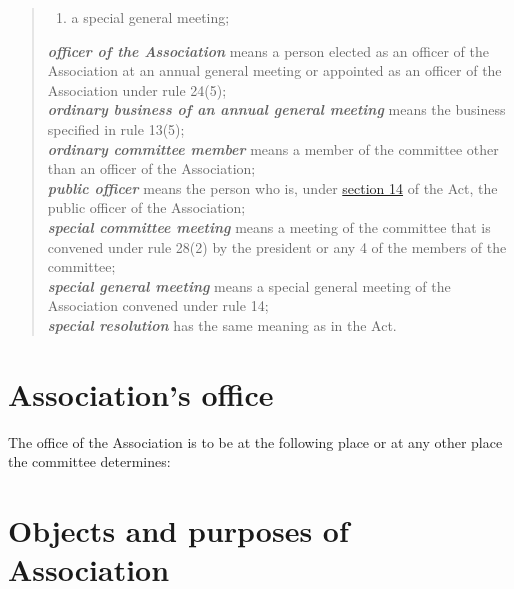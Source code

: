 \documentclass[a4paper,11pt]{article}
\begin{document}
\begin{quote}
\begin{enumerate}
		\item a special general meeting;
	\end{enumerate}
	\textit{\textbf{officer of the Association}} means a person elected as an officer of the Association at an annual general meeting or appointed as an officer of the Association under rule 24(5);\\
	\textit{\textbf{ordinary business of an annual general meeting}} means the business specified in rule 13(5);\\
	\textit{\textbf{ordinary committee member}} means a member of the committee other than an officer of the Association;\\
	\textit{\textbf{public officer}} means the person who is, under \href{https://www.legislation.tas.gov.au/view/html/inforce/2019-05-06/act-1964-064#GS14@EN}{section 14} of the Act, the public officer of the Association;\\
	\textit{\textbf{special committee meeting}} means a meeting of the committee that is convened under rule 28(2) by the president or any 4 of the members of the committee;\\
	\textit{\textbf{special general meeting}} means a special general meeting of the Association convened under rule 14;\\
	\textit{\textbf{special resolution}}	 has the same meaning as in the Act.
\end{quote}

\section{Association's office}

The office of the Association is to be at the following place or at any other place the committee determines:\\
\orgOffice{}

\section{Objects and purposes of Association}
\end{document}
